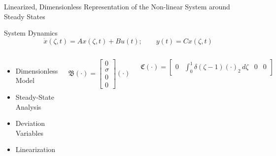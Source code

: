 \documentclass[8pt]{beamer}
\begin{document}
\begin{frame}{Linearized, Dimensionless Representation of the Non-linear System around Steady States}
    
\begin{block}{System Dynamics}
    \begin{equation} \label{eq:state_space_2}
        \dot{x}(\zeta, t) = A x(\zeta, t) + B u(t); \qquad
        y(t) = C x(\zeta, t)
    \end{equation}
\end{block}

\begin{columns}[t]
\begin{itemize}
    \item Dimensionless Model
    \item Steady-State Analysis
    \item Deviation Variables
    \item Linearization
\end{itemize}
\begin{equation} \label{eq:3_B_operator}
\mathfrak{B} (\cdot) = \begin{bmatrix} 0 \\ \sigma \\ 0 \\ 0 \end{bmatrix} (\cdot)
\end{equation}


\begin{equation} \label{eq:3_C_operator}
\mathfrak{C} (\cdot) = \begin{bmatrix} 0 & \int_0^1 \delta(\zeta - 1)(\cdot)_2\, d\zeta & 0 & 0 \end{bmatrix}
\end{equation}
\end{columns}

\end{frame}
\end{document}
